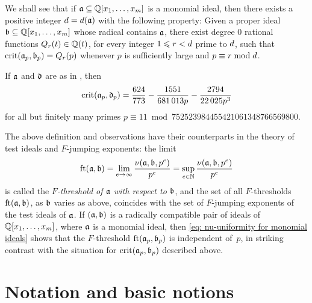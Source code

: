 \documentclass{amsart}
\begin{document}
We shall see that if $\mathfrak{a} \subseteq \mathbb{Q}[x_1,\ldots,x_m]$ is a monomial ideal, then there exists a positive integer $d = d(\mathfrak{a})$ with the following property:
Given a proper ideal $\mathfrak{b} \subseteq \mathbb{Q}[x_1,\ldots,x_m]$ whose radical contains $\mathfrak{a}$, there exist degree $0$ rational functions $Q_r(t) \in \mathbb{Q}(t)$, for every integer $1 \leqslant r < d$ prime to $d$, such that $\operatorname{crit}(\mathfrak{a}_p, \mathfrak{b}_p) = Q_r(p)$ whenever $p$ is sufficiently large and $p \equiv r \bmod d$.


\begin{example}
   If $\mathfrak{a}$ and $\mathfrak{d}$ are as in , then 
   \[
      \operatorname{crit}(\mathfrak{a}_p,\mathfrak{d}_p) =
      \frac{624}{773} - \frac{\num{1551}}{\num{681013} p} - \frac{\num{2794}}{\num{22025} p^3}
   \]
   for all but finitely many primes $p \equiv 11 \bmod \num{752523984455421061348766569800}$.
\end{example}

The above definition and observations have their counterparts in the theory of test ideals and $F$-jumping exponents: the limit
\[
   \operatorname{ft}(\mathfrak{a}, \mathfrak{b}) = \lim_{e\to \infty} \frac{\nu(\mathfrak{a},\mathfrak{b},p^e)}{p^e}
   = \sup_{e\in \mathbb{N}} \frac{\nu(\mathfrak{a},\mathfrak{b},p^e)}{p^e}
\]
is called the \emph{$F$-threshold of $\mathfrak{a}$ with respect to $\mathfrak{b}$}, and the set of all $F$-thresholds $\operatorname{ft}(\mathfrak{a}, \mathfrak{b})$, as $\mathfrak{b}$ varies as above, coincides with the set of $F$-jumping exponents of the test ideals of $\mathfrak{a}$.
If $(\mathfrak{a},\mathfrak{b})$ is a radically compatible pair of ideals of  $\mathbb{Q}[x_1,\ldots,x_m]$, where $\mathfrak{a}$ is a monomial ideal, then \eqref{eq: nu-uniformity for monomial ideals} shows that the $F$-threshold $\operatorname{ft}(\mathfrak{a}_p, \mathfrak{b}_p)$ is independent of~$p$, in striking contrast with the situation for $\operatorname{crit}(\mathfrak{a}_p,\mathfrak{b}_p)$ described above.


\section{Notation and basic notions}
\end{document}
